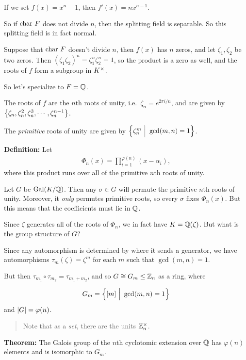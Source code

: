 If we set \(f(x) = x^n-1\), then \(f'(x) = nx^{n-1}\).

So if \(\mathrm{char}~ F\) does not divide \(n\), then the splitting field is
separable. So this splitting field is in fact normal.

Suppose that \(\mathrm{char}~ F\) doesn't divide \(n\), then \(f(x)\) has \(n\)
zeros, and let \(\zeta_1, \zeta_2\) be two zeros. Then
\((\zeta_1 \zeta_2)^n = \zeta_1^n \zeta_2^n = 1\), so the product is a
zero as well, and the roots of \(f\) form a subgroup in \(K^{\times}\).

So let's specialize to \(F = {\mathbb{Q}}\).

The roots of \(f\) are the \(n\)th roots of unity,
i.e.~\(\zeta_n = e^{2\pi i / n}\), and are given by
\(\left\{{\zeta_n, \zeta_n^2, \zeta_n^3, \cdots, \zeta_n^{n-1}}\right\}\).

The \emph{primitive} roots of unity are given by
\(\left\{{\zeta_n^m {~\mathrel{\Big|}~} \gcd(m, n) = 1}\right\}\).

\textbf{Definition:} Let
\begin{align*}
\Phi_n(x) = \prod_{i=1}^{\varphi(n)} (x-\alpha_i)
,\end{align*} where this product runs over all of the primitive \(n\)th
roots of unity.

Let \(G\) be \(\mathrm{Gal}(K/{\mathbb{Q}})\). Then any \(\sigma\in G\) will permute the
primitive \(n\)th roots of unity. Moreover, it \emph{only} permutes
primitive roots, so every \(\sigma\) fixes \(\Phi_n(x)\). But this means
that the coefficients must lie in \({\mathbb{Q}}\).

Since \(\zeta\) generates all of the roots of \(\Phi_n\), we in fact
have \(K = {\mathbb{Q}}(\zeta)\). But what is the group structure of \(G\)?

Since any automorphism is determined by where it sends a generator, we
have automorphisms \(\tau_m(\zeta) = \zeta^m\) for each \(m\) such that
\(\gcd(m, n) = 1\).

But then \(\tau_{m_1} \circ \tau_{m_2} = \tau_{m_1 + m_2}\), and so
\(G \cong G_m \leq {\mathbb{Z}}_n\) as a ring, where

\begin{align*}
G_m = \left\{{[m] {~\mathrel{\Big|}~} \gcd(m, n) = 1}\right\}
\end{align*} and \({\left\lvert {G} \right\rvert} = \varphi(n)\).

\begin{quote}
Note that as a \emph{set}, there are the units \({\mathbb{Z}}_n^{\times}\).
\end{quote}

\textbf{Theorem:} The Galois group of the \(n\)th cyclotomic extension
over \({\mathbb{Q}}\) has \(\varphi(n)\) elements and is isomorphic to \(G_m\).

